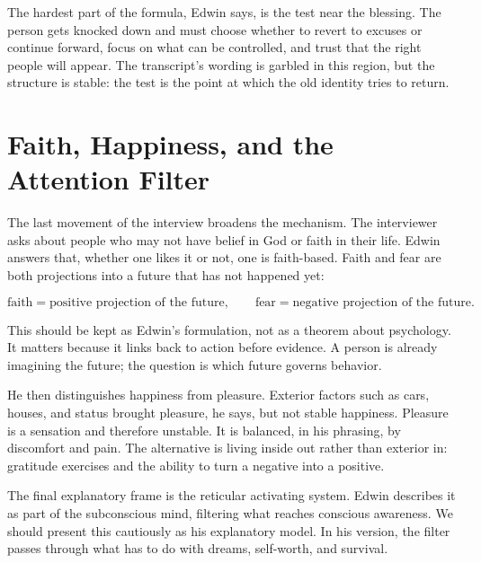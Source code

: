 The hardest part of the formula, Edwin says, is the test near the blessing. The person gets knocked down and must choose whether to revert to excuses or continue forward, focus on what can be controlled, and trust that the right people will appear. The transcript's wording is garbled in this region, but the structure is stable: the test is the point at which the old identity tries to return.

\section{Faith, Happiness, and the Attention Filter}

The last movement of the interview broadens the mechanism. The interviewer asks about people who may not have belief in God or faith in their life. Edwin answers that, whether one likes it or not, one is faith-based. Faith and fear are both projections into a future that has not happened yet:

\begin{equation}
\text{faith}
=
\text{positive projection of the future},
\qquad
\text{fear}
=
\text{negative projection of the future}.
\end{equation}

This should be kept as Edwin's formulation, not as a theorem about psychology. It matters because it links back to action before evidence. A person is already imagining the future; the question is which future governs behavior.

He then distinguishes happiness from pleasure. Exterior factors such as cars, houses, and status brought pleasure, he says, but not stable happiness. Pleasure is a sensation and therefore unstable. It is balanced, in his phrasing, by discomfort and pain. The alternative is living inside out rather than exterior in: gratitude exercises and the ability to turn a negative into a positive.

The final explanatory frame is the reticular activating system. Edwin describes it as part of the subconscious mind, filtering what reaches conscious awareness. We should present this cautiously as his explanatory model. In his version, the filter passes through what has to do with dreams, self-worth, and survival.

